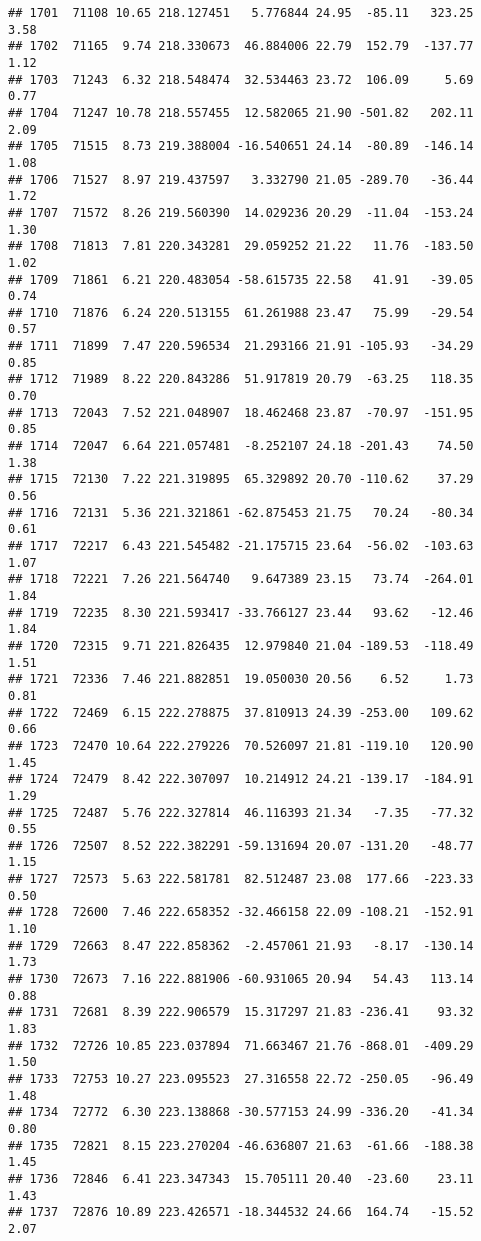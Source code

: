 \documentclass[]{article}
\begin{document}
\begin{verbatim}
## 1701  71108 10.65 218.127451   5.776844 24.95  -85.11   323.25  3.58
## 1702  71165  9.74 218.330673  46.884006 22.79  152.79  -137.77  1.12
## 1703  71243  6.32 218.548474  32.534463 23.72  106.09     5.69  0.77
## 1704  71247 10.78 218.557455  12.582065 21.90 -501.82   202.11  2.09
## 1705  71515  8.73 219.388004 -16.540651 24.14  -80.89  -146.14  1.08
## 1706  71527  8.97 219.437597   3.332790 21.05 -289.70   -36.44  1.72
## 1707  71572  8.26 219.560390  14.029236 20.29  -11.04  -153.24  1.30
## 1708  71813  7.81 220.343281  29.059252 21.22   11.76  -183.50  1.02
## 1709  71861  6.21 220.483054 -58.615735 22.58   41.91   -39.05  0.74
## 1710  71876  6.24 220.513155  61.261988 23.47   75.99   -29.54  0.57
## 1711  71899  7.47 220.596534  21.293166 21.91 -105.93   -34.29  0.85
## 1712  71989  8.22 220.843286  51.917819 20.79  -63.25   118.35  0.70
## 1713  72043  7.52 221.048907  18.462468 23.87  -70.97  -151.95  0.85
## 1714  72047  6.64 221.057481  -8.252107 24.18 -201.43    74.50  1.38
## 1715  72130  7.22 221.319895  65.329892 20.70 -110.62    37.29  0.56
## 1716  72131  5.36 221.321861 -62.875453 21.75   70.24   -80.34  0.61
## 1717  72217  6.43 221.545482 -21.175715 23.64  -56.02  -103.63  1.07
## 1718  72221  7.26 221.564740   9.647389 23.15   73.74  -264.01  1.84
## 1719  72235  8.30 221.593417 -33.766127 23.44   93.62   -12.46  1.84
## 1720  72315  9.71 221.826435  12.979840 21.04 -189.53  -118.49  1.51
## 1721  72336  7.46 221.882851  19.050030 20.56    6.52     1.73  0.81
## 1722  72469  6.15 222.278875  37.810913 24.39 -253.00   109.62  0.66
## 1723  72470 10.64 222.279226  70.526097 21.81 -119.10   120.90  1.45
## 1724  72479  8.42 222.307097  10.214912 24.21 -139.17  -184.91  1.29
## 1725  72487  5.76 222.327814  46.116393 21.34   -7.35   -77.32  0.55
## 1726  72507  8.52 222.382291 -59.131694 20.07 -131.20   -48.77  1.15
## 1727  72573  5.63 222.581781  82.512487 23.08  177.66  -223.33  0.50
## 1728  72600  7.46 222.658352 -32.466158 22.09 -108.21  -152.91  1.10
## 1729  72663  8.47 222.858362  -2.457061 21.93   -8.17  -130.14  1.73
## 1730  72673  7.16 222.881906 -60.931065 20.94   54.43   113.14  0.88
## 1731  72681  8.39 222.906579  15.317297 21.83 -236.41    93.32  1.83
## 1732  72726 10.85 223.037894  71.663467 21.76 -868.01  -409.29  1.50
## 1733  72753 10.27 223.095523  27.316558 22.72 -250.05   -96.49  1.48
## 1734  72772  6.30 223.138868 -30.577153 24.99 -336.20   -41.34  0.80
## 1735  72821  8.15 223.270204 -46.636807 21.63  -61.66  -188.38  1.45
## 1736  72846  6.41 223.347343  15.705111 20.40  -23.60    23.11  1.43
## 1737  72876 10.89 223.426571 -18.344532 24.66  164.74   -15.52  2.07

\end{verbatim}
\end{document}
